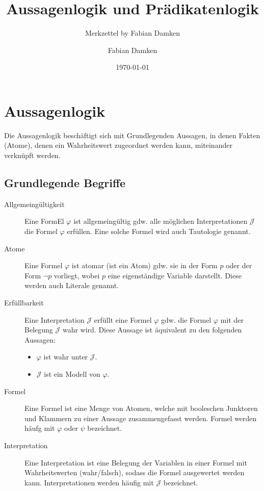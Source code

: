\documentclass[a4paper, 11pt, accentcolor = tud3b]{tudreport}
\title{Aussagenlogik und Prädikatenlogik}
\subtitle{Merkzettel by Fabian Damken}
\author{Fabian Damken}
\date{\today}
\begin{document}
    \maketitle
    \tableofcontents
    \listoftodos

    \chapter{Aussagenlogik}
        Die Aussagenlogik beschäftigt sich mit Grundlegenden Aussagen, in denen Fakten (Atome), denen ein Wahrheitswert zugeordnet werden kann, miteinander verknüpft werden.

        \section{Grundlegende Begriffe}
            \begin{description}
                \item[Allgemeingültigkeit] Eine FormEl $ \varphi $ ist allgemeingültig gdw. alle möglichen Interpretationen $ \mathcal{J} $ die Formel $ \varphi $ erfüllen. Eine solche Formel wird auch Tautologie genannt.
                \item[Atome] Eine Formel $ \varphi $ ist atomar (ist ein Atom) gdw. sie in der Form $ p $ oder der Form $ \lnot p $ vorliegt, wobei $ p $ eine eigenständige Variable darstellt. Diese werden auch Literale genannt.
                \item[Erfüllbarkeit] Eine Interpretation $ \mathcal{J} $ erfüllt eine Formel $ \varphi $ gdw. die Formel $ \varphi $ mit der Belegung $ \mathcal{J} $ wahr wird. Diese Aussage ist äquivalent zu den folgenden Aussagen:
                    \begin{itemize}
                        \item $ \varphi $ ist wahr unter $ \mathcal{J} $.
                        \item $ \mathcal{J} $ ist ein Modell von $ \varphi $.
                    \end{itemize}
                \item[Formel] Eine Formel ist eine Menge von Atomen, welche mit booleschen Junktoren und Klammern zu einer Aussage zusammengefasst werden. Formel werden häufg mit $ \varphi $ oder $ \psi $ bezeichnet.
                \item[Interpretation] Eine Interpretation ist eine Belegung der Variablen in einer Formel mit Wahrheitswerten (wahr/falsch), sodass die Formel ausgewertet werden kann. Interpretationen werden häufig mit $ \mathcal{J} $ bezeichnet.

\end{description}
\end{document}
